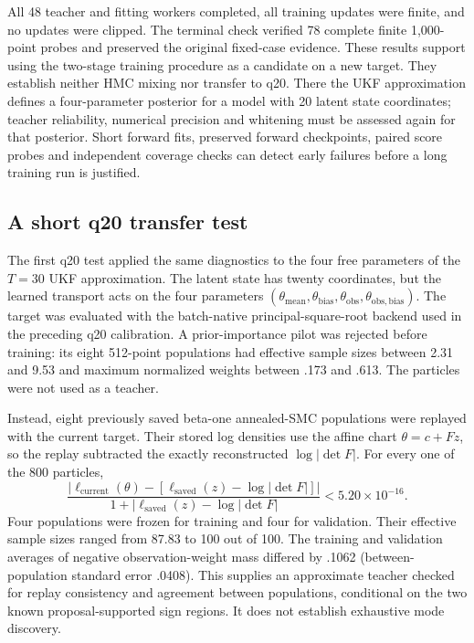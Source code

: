 All 48 teacher and fitting workers completed, all training updates were finite,
and no updates were clipped. The terminal check verified 78 complete finite
1,000-point probes and preserved the original fixed-case evidence. These
results support using the two-stage training procedure as a candidate on a
new target. They establish neither HMC mixing nor transfer to q20. There the
UKF approximation defines a four-parameter posterior for a model with 20 latent
state coordinates; teacher reliability, numerical precision and whitening
must be assessed again for that posterior. Short forward fits, preserved
forward checkpoints, paired score probes and independent coverage checks can
detect early failures before a long training run is justified.

\subsection{A short q20 transfer test}

The first q20 test applied the same diagnostics to the four free parameters of
the $T=30$ UKF approximation. The latent state has twenty coordinates, but the
learned transport acts on the four parameters
$(\theta_{\mathrm{mean}},\theta_{\mathrm{bias}},
\theta_{\mathrm{obs}},\theta_{\mathrm{obs,bias}})$. The target was evaluated
with the batch-native principal-square-root backend used in the preceding q20
calibration. A prior-importance pilot was
rejected before training: its eight 512-point populations had effective sample
sizes between 2.31 and 9.53 and maximum normalized weights between .173 and
.613. The particles were not used as a teacher.

Instead, eight previously saved beta-one annealed-SMC populations were replayed
with the current target. Their stored log densities use the affine chart
$\theta=c+Fz$, so the replay subtracted the exactly reconstructed
$\log|\det F|$. For every one of the 800 particles,
\begin{equation}
 \frac{|\ell_{\mathrm{current}}(\theta)-
 [\ell_{\mathrm{saved}}(z)-\log|\det F|]|}
 {1+|\ell_{\mathrm{saved}}(z)-\log|\det F|} < 5.20\times 10^{-16}.
\end{equation}
Four populations were frozen for training and four for validation. Their
effective sample sizes ranged from 87.83 to 100 out of 100. The training and
validation averages of negative observation-weight mass differed by .1062
(between-population standard error .0408). This supplies an approximate
teacher checked for replay consistency and agreement between populations,
conditional on the two
known proposal-supported sign regions. It does not establish exhaustive mode
discovery.

